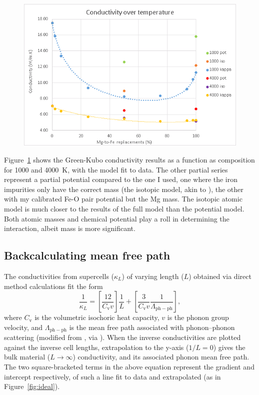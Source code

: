 \begin{figure}[h!]
  \includegraphics[width=\linewidth]{Figures/kc_iso_pot_full.png}
  \caption[kc iso pot full]{}
  \label{kc_iso_pot_full}
\end{figure}

Figure~\ref{kc_iso_pot_full} shows the Green-Kubo conductivity results as a function as composition for 1000 and 4000~K, with the model fit to data. The other partial series represent a partial potential compared to the one I used, one where the iron impurities only have the correct mass (the isotopic model, akin to \citet{Ammann2014}), the other with my calibrated Fe-O pair potential but the Mg mass. The isotopic atomic model is much closer to the results of the full model than the potential model. Both atomic masses and chemical potential play a roll in determining the interaction, albeit mass is more significant. 



\subsection{Backcalculating mean free path}

The conductivities from supercells ($\kappa_{L}$) of varying length ($L$) obtained via direct method calculations fit the form
%
\begin{equation} 
\frac{1}{\kappa_{L}}=\left [ \frac{12}{C_{\mathrm{v}}v} \right ]\frac{1}{L}+\left [ \frac{3}{C_{\mathrm{v}}v} \frac{1}{\Lambda_{\mathrm{ph-ph}}} \right ],
\label{eq.ss2010.28}
\end{equation}
%
where $C_{\mathrm{v}}$ is the volumetric isochoric heat capacity, $v$ is the phonon group velocity, and $\Lambda_{\mathrm{ph-ph}}$ is the mean free path associated with phonon--phonon scattering (modified from \cite{Schelling2002}, via \cite{Stackhouse2010}). When the inverse conductivities are plotted against the inverse cell lengths, extrapolation to the y-axis ($1/L = 0$) gives the bulk material ($L\rightarrow \infty$) conductivity, and its associated phonon mean free path. The two square-bracketed terms in the above equation represent the gradient and intercept respectively, of such a line fit to data and extrapolated (as in Figure~\ref{fig:ideal}). 

